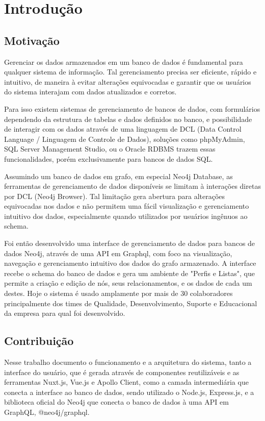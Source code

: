 \chapter{Introdução}

\section{Motivação}

Gerenciar os dados armazenados em um banco de dados é fundamental para qualquer sistema de informação. Tal gerenciamento precisa ser eficiente, rápido e intuitivo, de maneira à evitar alterações equivocadas e garantir que os usuários do sistema interajam com dados atualizados e corretos.

Para isso existem sistemas de gerenciamento de bancos de dados, com formulários dependendo da estrutura de tabelas e dados definidos no banco, e possibilidade de interagir com os dados através de uma linguagem de DCL (Data Control Language / Linguagem de Controle de Dados), soluções como phpMyAdmin, SQL Server Management Studio, ou o Oracle RDBMS trazem essas funcionalidades, porém exclusivamente para bancos de dados SQL.

Assumindo um banco de dados em grafo, em especial Neo4j Database, as ferramentas de gerenciamento de dados disponíveis se limitam à interações diretas por DCL (Neo4j Browser). Tal limitação gera abertura para alterações equivocadas nos dados e não permitem uma fácil visualização e gerenciamento intuitivo dos dados, especialmente quando utilizados por usuários ingênuos ao schema.

Foi então desenvolvido uma interface de gerenciamento de dados para bancos de dados Neo4j, através de uma API em Graphql, com foco na visualização, navegação e gerenciamento intuitivo dos dados do grafo armazenado. A interface recebe o schema do banco de dados e gera um ambiente de "Perfis e Listas", que permite a criação e edição de nós, seus relacionamentos, e os dados de cada um destes. Hoje o sistema é usado amplamente por mais de 30 colaboradores principalmente dos times de Qualidade, Desenvolvimento, Suporte e Educacional da empresa para qual foi desenvolvido.

\section{Contribuição}

Nesse trabalho documento o funcionamento e a arquitetura do sistema, tanto a interface do usuário, que é gerada através de componentes reutilizáveis e as ferramentas Nuxt.js, Vue.js e Apollo Client, como a camada intermediária que conecta a interface ao banco de dados, sendo utilizado o Node.js, Express.js, e a biblioteca oficial do Neo4j que conecta o banco de dados à uma API em GraphQL, @neo4j/graphql.

